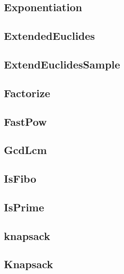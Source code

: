 \subsection{ Exponentiation}
\raggedbottom
\hrulefill
\subsection{ ExtendedEuclides}
\raggedbottom
\hrulefill
\subsection{ ExtendEuclidesSample}
\raggedbottom
\hrulefill
\subsection{ Factorize}
\raggedbottom
\hrulefill
\subsection{ FastPow}
\raggedbottom
\hrulefill
\subsection{ GcdLcm}
\raggedbottom
\hrulefill
\subsection{ IsFibo}
\raggedbottom
\hrulefill
\subsection{ IsPrime}
\raggedbottom
\hrulefill
\subsection{ knapsack}
\raggedbottom
\hrulefill
\subsection{ Knapsack}
\raggedbottom
\hrulefill
